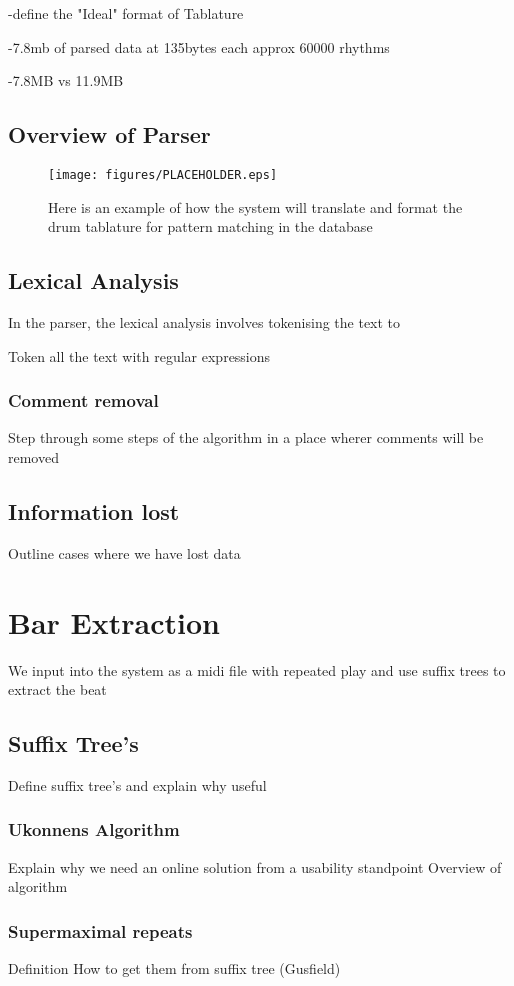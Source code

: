 \documentclass[12pt,twoside,notitlepage]{report}
\begin{document}
	-define the "Ideal" format of Tablature

	-7.8mb of parsed data at 135bytes each approx 60000 rhythms

	-7.8MB vs 11.9MB
	
		\subsection{Overview of Parser}
\begin{figure}[h]
			\centerline{\texttt{[image: figures/PLACEHOLDER.eps]}}
			\caption{\label{exampleIdealParse} Here is an example of how the system will translate and format the drum tablature for pattern matching in the database}
\end{figure}

		\subsection{Lexical Analysis}
		In the parser, the lexical analysis involves tokenising the text to 
		
		Token all the text with regular expressions
			\subsubsection{Comment removal}
			Step through some steps of the algorithm in a place wherer comments will be removed
		\subsection{Information lost}
		Outline cases where we have lost data
	\section{Bar Extraction}
	We input into the system as a midi file with repeated play and use suffix trees to extract the beat
		\subsection{\label{subsec:SuffixTree}Suffix Tree's}
		Define suffix tree's and explain why useful
			\subsubsection{\label{subsubsec:Ukonnens}Ukonnens Algorithm}
			Explain why we need an online solution from a usability standpoint
			Overview of algorithm
			\subsubsection{Supermaximal repeats}
			Definition
			How to get them from suffix tree (Gusfield)
			
\end{document}
